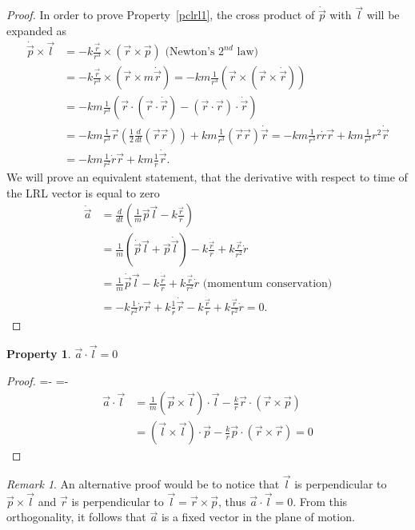 \documentclass[12pt,a4paper]{report}
\newtheorem{property}{Property}[section]
\theoremstyle{definition}
\theoremstyle{remark}
\newtheorem*{remark}{Remark}
\theoremstyle{remark}
\begin{document}
\begin{proof}
In order to prove Property~\ref{pclrl1}, the cross product of $\dot{\vec{p}}$ with $\vec{l}$ will be expanded as
\begin{align*}
\dot{\vec{p}}\times\vec{l} &= -k\frac{\vec{r}}{r^3}\times(\vec{r}\times\vec{p}) \text{ (Newton's }2^{nd}\text{ law)}\\
&= -k\frac{\vec{r}}{r^3}\times(\vec{r}\times m\dot{\vec{r}})=-km\frac{1}{r^3}(\vec{r}\times(\vec{r}\times\dot{\vec{r}})) \\
&= -km\frac{1}{r^3}\left(\vec{r}\cdot(\vec{r}\cdot\dot{\vec{r}})-(\vec{r}\cdot\vec{r})\cdot\dot{\vec{r}}\right) \\
&= -km\frac{1}{r^3}\vec{r}\left(\frac{1}{2}\frac{d}{dt}(\vec{r}\vec{r})\right)+km\frac{1}{r^3}(\vec{r}\vec{r})\dot{\vec{r}}= -km\frac{1}{r^3}r\dot{r}\vec{r}+km\frac{1}{r^3}r^2\dot{\vec{r}} \\
&= -km\frac{1}{r^2}\dot{r}\vec{r}+km\frac{1}{r}\dot{\vec{r}}.
\end{align*}
We will prove an equivalent statement, that the derivative with respect to time of the LRL vector is equal to zero
\begin{align*}
\dot{\vec{a}} &= \frac{d}{dt}\left(\frac{1}{m}\vec{p}\vec{l}-k\frac{\vec{r}}{r}\right) \\
&= \frac{1}{m}\left(\dot{\vec{p}}\vec{l}+\vec{p}\dot{\vec{l}}\right)-k\frac{\dot{\vec{r}}}{r}+k\frac{\vec{r}}{r^2}\dot{r} \\
&= \frac{1}{m}\dot{\vec{p}}\vec{l}-k\frac{\dot{\vec{r}}}{r}+k\frac{\vec{r}}{r^2}\dot{r} \text{ (momentum conservation)} \\
&= -k\frac{1}{r^2}\dot{r}\vec{r}+k\frac{1}{r}\dot{\vec{r}}-k\frac{\dot{\vec{r}}}{r}+k\frac{\vec{r}}{r^2}\dot{r}=0.
\end{align*}
\end{proof}

\begin{property}\label{pclrl2}
$\vec{a}\cdot\vec{l}=0$
\end{property}
\begin{proof}
\abovedisplayskip=-\baselineskip
\belowdisplayskip=0pt
\abovedisplayshortskip=-\baselineskip
\belowdisplayshortskip=0pt
\begin{align*}
\vec{a}\cdot\vec{l} &= \frac{1}{m}(\vec{p}\times\vec{l})\cdot\vec{l}-\frac{k}{r}\vec{r}\cdot(\vec{r}\times\vec{p}) \\
&= (\vec{l}\times\vec{l})\cdot\vec{p}-\frac{k}{r}\vec{p}\cdot(\vec{r}\times\vec{r}) =0
\end{align*}
\end{proof}
\begin{remark}
An alternative proof would be to notice that $\vec{l}$ is perpendicular to $\vec{p}\times\vec{l}$ and $\vec{r}$ is perpendicular to $\vec{l}=\vec{r}\times\vec{p}$, thus $\vec{a}\cdot\vec{l}=0$. From this orthogonality, it follows that $\vec{a}$ is a fixed vector in the plane of motion.
\end{remark}
\end{document}
